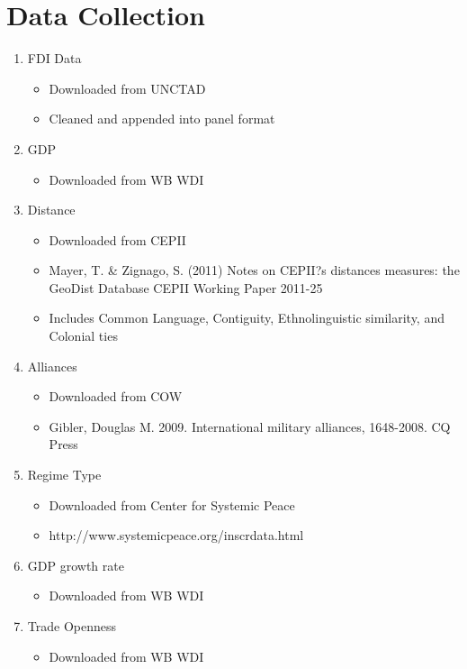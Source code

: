 \documentclass{article}
\begin{document}
\newpage
\section{Data Collection}



\begin{enumerate}
	\item {FDI Data}
		\begin{itemize}
			\item{Downloaded from UNCTAD}
			\item{Cleaned and appended into panel format}
		\end{itemize}
	\item {GDP}
		\begin{itemize}
			\item{Downloaded from WB WDI}
		\end{itemize}
	\item {Distance}
		\begin{itemize}
			\item{Downloaded from CEPII}
			\item{Mayer, T. \& Zignago, S. (2011) Notes on CEPII?s distances measures: the GeoDist Database
					CEPII Working Paper 2011-25}
			\item{Includes Common Language, Contiguity, Ethnolinguistic similarity, and Colonial ties}
		\end{itemize}
	\item {Alliances}
		\begin{itemize}
			\item{Downloaded from COW}
			\item{Gibler, Douglas M. 2009. International military alliances, 1648-2008. CQ Press}
		\end{itemize}
	\item {Regime Type}
		\begin{itemize}
			\item{Downloaded from Center for Systemic Peace}
			\item{http://www.systemicpeace.org/inscrdata.html}
		\end{itemize}
	\item {GDP growth rate}
		\begin{itemize}
			\item{Downloaded from WB WDI}
		\end{itemize}
	\item {Trade Openness}
		\begin{itemize}
			\item{Downloaded from WB WDI}

\end{itemize}
\end{enumerate}
\end{document}
